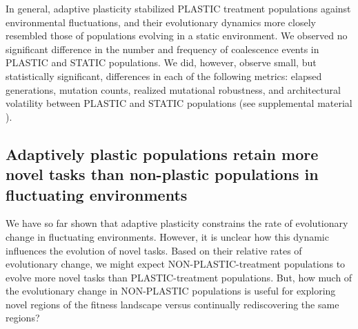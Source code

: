 In general, adaptive plasticity stabilized PLASTIC treatment populations against environmental fluctuations, and their evolutionary dynamics more closely resembled those of populations evolving in a static environment.
We observed no significant difference in the number and frequency of coalescence events in PLASTIC and STATIC populations.
We did, however, observe small, but statistically significant, differences in each of the following metrics: elapsed generations, mutation counts, realized mutational robustness, and architectural volatility between PLASTIC and STATIC populations (see supplemental material \citealt{supplemental_material}).

\vspace{0.5cm}
\subsection{Adaptively plastic populations retain more novel tasks than non-plastic populations in fluctuating environments}





We have so far shown that adaptive plasticity constrains the rate of evolutionary change in fluctuating environments.
However, it is unclear how this dynamic influences the evolution of novel tasks.
Based on their relative rates of evolutionary change, we might expect NON-PLASTIC-treatment populations to evolve more novel tasks than PLASTIC-treatment populations.
But, how much of the evolutionary change in NON-PLASTIC populations is useful for exploring novel regions of the fitness landscape versus continually rediscovering the same regions?

